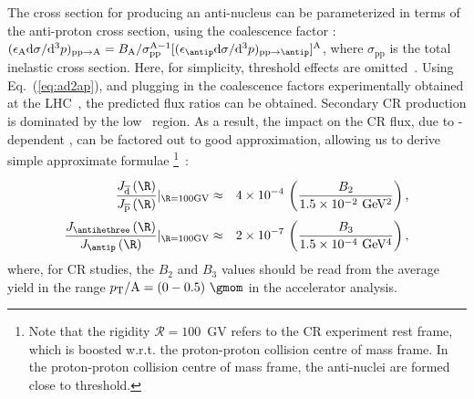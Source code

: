 The cross section for producing an anti-nucleus can be parameterized in terms of the anti-proton cross section, using the coalescence factor \BA: 
$(\epsilon_\mathrm{A}\rmd\sigma/\rmd^3p)_{\mathrm{pp}\to \mathrm{A}} = B_{\mathrm{A}}/\sigma_{\mathrm{pp}}^{\mathrm{A}-1} [(\epsilon_{\antip} \rmd\sigma/\rmd^3p)_{\mathrm{pp}\to \antip}]^\mathrm{A}$, 
where $\sigma_{\mathrm{pp}}$ is the total inelastic \pp cross section. 
Here, for simplicity, threshold effects are omitted~\cite{Duperray:2002pj,Duperray:2003tv,Blum:2017qnn}. 
%
Using Eq.~(\ref{eq:ad2ap}), and plugging in the coalescence factors experimentally obtained at the LHC~\cite{Acharya:2017fvb}, the predicted flux ratios can be obtained. 
Secondary CR production is dominated by the low \pT\ region. As a result, the impact on the CR flux, due to \pT-dependent \BA, can be factored out to good approximation, allowing us to derive simple approximate formulae 
\footnote{Note that the rigidity $\mathcal{R}=100$~GV refers to the CR experiment rest frame, which is boosted w.r.t. the proton-proton collision centre of mass frame. In the proton-proton collision centre of mass frame, the anti-nuclei are formed close to threshold.}~\cite{Blum:2017qnn}:
%
\begin{eqnarray}\label{eq:J2}\frac{J_{\overline{\rm d}}\left(\R\right)}{J_{\overline{\rm p}}\left(\R\right)}\huge|_{\R=100{\rm GV}}&\approx&4\times10^{-4}\,\left(\frac{B_2}{1.5\times10^{-2}~\rm GeV^2}\right),\\%
%
%
\label{eq:J3}\frac{J_{\antihethree}\left(\R\right)}{J_{\antip}\left(\R\right)}\huge|_{\R=100{\rm GV}}&\approx&2\times10^{-7}\,\left(\frac{B_3}{1.5\times10^{-4}~\rm GeV^4}\right),\end{eqnarray}
%
where, for CR studies, the $B_2$ and $B_3$ values should be read from the average yield in the range $\pT/\mathrm{A}=(0-0.5)~\gmom$ in the accelerator analysis. 
